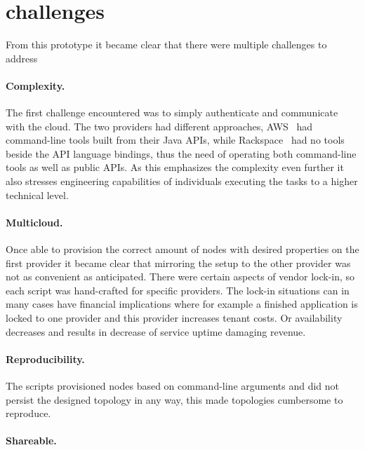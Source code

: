\section{challenges}

From this prototype it became clear that there were multiple challenges to address

\paragraph{Complexity.} 

The first challenge encountered was to simply
authenticate and communicate with the cloud. The two providers 
had different approaches, AWS~\cite{aws} had command-line tools built from their Java APIs,
while Rackspace~\cite{rackspace} had no tools beside the API language bindings,
thus the need of operating both command-line tools as well as public APIs.
As this emphasizes the complexity even further it also stresses engineering capabilities
of individuals executing the tasks to a higher technical level.

\paragraph{Multicloud.}

Once able to provision the correct amount of nodes with desired properties
on the first provider it became clear that mirroring the setup to the other provider 
was not as convenient as anticipated.
There were certain aspects of vendor lock-in, so each script was hand-crafted for specific providers.
The lock-in situations can in many cases have financial implications where for example
a finished application is locked to one provider and this provider increases tenant costs.
Or availability decreases and results in decrease of service uptime damaging revenue.

\paragraph{Reproducibility.}

The scripts provisioned nodes based on command-line arguments
and did not persist the designed topology in any way, this made topologies cumbersome to reproduce.

\paragraph{Shareable.}

